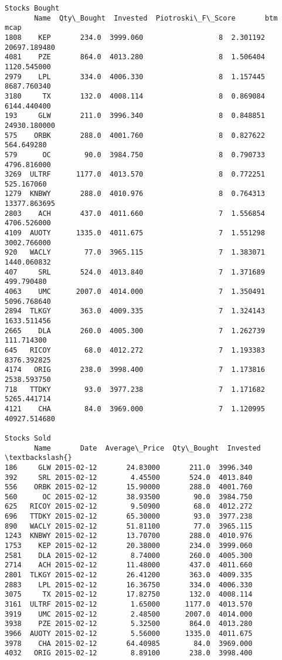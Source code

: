 \documentclass[11pt]{article}
\begin{document}
\begin{Verbatim}[commandchars=\\\{\}]
Stocks Bought
       Name  Qty\_Bought  Invested  Piotroski\_F\_Score       btm          mcap
1808    KEP       234.0  3999.060                  8  2.301192  20697.189480
4081    PZE       864.0  4013.280                  8  1.506404   1120.545000
2979    LPL       334.0  4006.330                  8  1.157445   8687.760340
3180     TX       132.0  4008.114                  8  0.869084   6144.440400
193     GLW       211.0  3996.340                  8  0.848851  24930.180000
575    ORBK       288.0  4001.760                  8  0.827622    564.649280
579      OC        90.0  3984.750                  8  0.790733   4796.816000
3269  ULTRF      1177.0  4013.570                  8  0.772251    525.167060
1279  KNBWY       288.0  4010.976                  8  0.764313  13377.863695
2803    ACH       437.0  4011.660                  7  1.556854   4706.526000
4109  AUOTY      1335.0  4011.675                  7  1.551298   3002.766000
920   WACLY        77.0  3965.115                  7  1.383071   1440.060832
407     SRL       524.0  4013.840                  7  1.371689    499.790480
4063    UMC      2007.0  4014.000                  7  1.350491   5096.768640
2894  TLKGY       363.0  4009.335                  7  1.324143   1633.511456
2665    DLA       260.0  4005.300                  7  1.262739    111.714300
645   RICOY        68.0  4012.272                  7  1.193383   8376.392825
4174   ORIG       238.0  3998.400                  7  1.173816   2538.593750
718   TTDKY        93.0  3977.238                  7  1.171682   5265.441714
4121    CHA        84.0  3969.000                  7  1.120995  40927.514680

Stocks Sold
       Name       Date  Average\_Price  Qty\_Bought  Invested  \textbackslash{}
186     GLW 2015-02-12       24.83000       211.0  3996.340
392     SRL 2015-02-12        4.45500       524.0  4013.840
556    ORBK 2015-02-12       15.90000       288.0  4001.760
560      OC 2015-02-12       38.93500        90.0  3984.750
625   RICOY 2015-02-12        9.50900        68.0  4012.272
696   TTDKY 2015-02-12       65.30000        93.0  3977.238
890   WACLY 2015-02-12       51.81100        77.0  3965.115
1243  KNBWY 2015-02-12       13.70700       288.0  4010.976
1753    KEP 2015-02-12       20.38000       234.0  3999.060
2581    DLA 2015-02-12        8.74000       260.0  4005.300
2714    ACH 2015-02-12       11.48000       437.0  4011.660
2801  TLKGY 2015-02-12       26.41200       363.0  4009.335
2883    LPL 2015-02-12       16.36750       334.0  4006.330
3075     TX 2015-02-12       17.82750       132.0  4008.114
3161  ULTRF 2015-02-12        1.65000      1177.0  4013.570
3919    UMC 2015-02-12        2.48500      2007.0  4014.000
3938    PZE 2015-02-12        5.32500       864.0  4013.280
3966  AUOTY 2015-02-12        5.56000      1335.0  4011.675
3978    CHA 2015-02-12       64.40985        84.0  3969.000
4032   ORIG 2015-02-12        8.89100       238.0  3998.400


\end{Verbatim}
\end{document}
